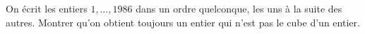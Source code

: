 On écrit les entiers $1, \ldots, 1986$ dans un ordre quelconque, les uns à la suite des autres. Montrer qu'on obtient toujours un entier qui n'est pas le cube d'un entier.
